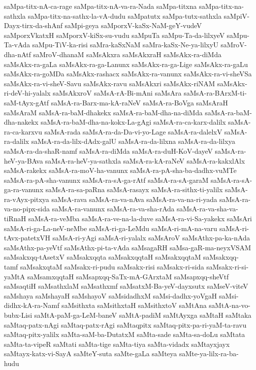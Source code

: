 {saMpa-titx-nA-ca-rage
saMpa-titx-nA-va-ra-Nada
saMpa-titxna
saMpa-titx-na-sathxla
saMpa-titx-na-sathx-la-vA-dudu
saMpatutx
saMpa-tutx-sathxla
saMpiV-Dayx-tirx-da-shAnf
saMpi-geya
saMporxV-kaSx-NaM-geY-vudeV
saMporxVkatxH
saMporxV-kiSx-su-vudu
saMpuTa
saMpu-Ta-da-lilxyeV
saMpu-Ta-vAda
saMpu-TiV-ka-risi
saMra-kaSxNaM
saMra-kaSx-Ne-ya-lilxyU
saMroV-dha-nAtf
saMroV-dhanaM
saMsAkxra
saMsAkxraH
saMsAkx-ra-diMda
saMsAkx-ra-gaLa
saMsAkx-ra-ga-Lanunx
saMsAkx-ra-ga-Lige
saMsAkx-ra-gaLu
saMsAkx-ra-goMDa
saMsAkx-rashacx
saMsAkx-ra-vanunx
saMsAkx-ra-vi-sheVSa
saMsAkx-ra-vi-sheV-Savu
saMsAkx-ravu
saMsAkxri
saMsAkx-riNAM
saMsAkx-ri-deV-hi-yalalx
saMsAkxroV
saMsA-rA-Bi-mAni
saMsAra
saMsA-ra-BArxM-ti-saM-tAyx-gAtf
saMsA-ra-Barx-ma-kA-raNeV
saMsA-ra-BoVga
saMsAraH
saMsAraM
saMsA-ra-baM-dhakekx
saMsA-ra-baM-dha-na-diMda
saMsA-ra-baM-dha-nakekx
saMsA-ra-baM-dha-na-kokx-La-gAgi
saMsA-ra-ca-karx-dalilx
saMsA-ra-ca-karxvu
saMsA-rada
saMsA-ra-da-Da-vi-yo-Lage
saMsA-ra-dalelxV
saMsA-ra-dalilx
saMsA-ra-da-lilx-dAdx-galU
saMsA-ra-da-lilxna
saMsA-ra-da-lilxya
saMsA-ra-da-shaR-namf
saMsA-ra-diMda
saMsA-ra-duH-KoV-dayeV
saMsA-ra-heV-ya-BAva
saMsA-ra-heV-ya-sathxla
saMsA-ra-kA-raNeV
saMsA-ra-kakxlAlx
saMsA-rakekx
saMsA-ra-moV-ha-vanunx
saMsA-ra-pA-sha-ba-dadhx-vuMTe
saMsA-ra-pA-sha-vanunx
saMsA-ra-sA-ga-rAtf
saMsA-ra-sA-garaM
saMsA-ra-sA-ga-ra-vanunx
saMsA-ra-sa-paRna
saMsA-rasayx
saMsA-ra-sithx-ti-yalilx
saMsA-ra-vAyx-pitxya
saMsA-rava
saMsA-ra-va-nAva
saMsA-ra-va-na-ri-yada
saMsA-ra-va-no-pipx-sida
saMsA-ra-vanunx
saMsA-ra-va-sha-rAda
saMsA-ra-va-sha-va-tiRnaH
saMsA-ra-veMba
saMsA-ra-ve-na-la-duve
saMsA-ra-vi-Sa-yakekx
saMsAri
saMsA-ri-ga-La-neV-neMbe
saMsA-ri-ga-LeMdu
saMsA-ri-mA-na-varu
saMsA-ri-tAvx-patetxVH
saMsA-ri-yAgi
saMsA-ri-yalalx
saMsAroV
saMsAthx-pa-ka-nAda
saMsAthx-pa-yeVtf
saMsAthx-pi-ta-vAda
saMsagaRH
saMsa-gaR-ma-neyxVSAM
saMsakxqq-tAsetxV
saMsakxqqta
saMsakxqqtaH
saMsakxqqtaM
saMsakxqq-tamf
saMsakxqtaM
saMsakx-ri-pudu
saMsakx-risi
saMsakx-ri-sida
saMsakx-ri-si-yaMtA
saMsamxqqtaH
saMsapxqq-SaTx-mA-GArxtaM
saMsapxqq-sheVtf
saMsaqtiH
saMsathxlaM
saMsathxmf
saMsatxM-Ba-yeV-dayxsutx
saMseV-viteV
saMshaya
saMshayaH
saMshayoV
saMsidadhxM
saMsi-dadhx-yoVgaH
saMsi-didhx-kA-ra-Namf
saMsithxta
saMsithxtaH
saMsithxtoV
saMtAna
saMtA-na-vo-bubx-Lisi
saMtA-paM-ga-LeM-baneV
saMtA-padiM
saMtAyxga
saMtaH
saMtaka
saMtaq-patx-nAgi
saMtaq-patx-rAgi
saMtaqpitx
saMtaq-pitx-pa-ri-yaM-ta-ravu
saMtaq-pitx-yalilx
saMta-saM-ba-DutatxM
saMta-sade
saMta-sa-doLu
saMtata
saMta-ta-vipeR
saMtati
saMta-tige
saMta-tiya
saMta-vidadx
saMtayxjayx
saMtayx-katx-vi-SayA
saMteY-suta
saMte-gaLa
saMteya
saMte-ya-lilx-ra-ba-hudu
}
